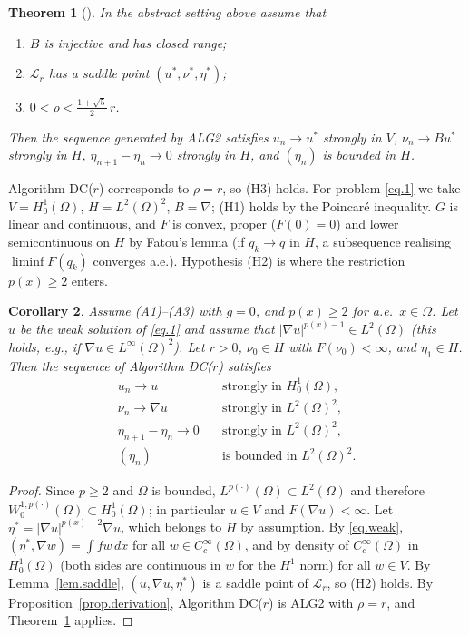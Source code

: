 \documentclass[11pt]{amsart}
\newcommand{\LL}{\mathcal L}
\newcommand{\dx}{\,dx}
\newcommand{\pp}{p(\cdot)}
\newtheorem{teo}{Theorem}[section]
\newtheorem{corol}[teo]{Corollary}
\theoremstyle{definition}
\theoremstyle{remark}
\numberwithin{equation}{section}
\begin{document}
\begin{teo}[{\cite[Chapter~VI, Theorem~5.1]{Glowinski}}]\label{thm.glowinski}
In the abstract setting above assume that
\begin{enumerate}
\item[(H1)] $B$ is injective and has closed range;
\item[(H2)] $\LL_r$ has a saddle point $(u^*,\nu^*,\eta^*)$;
\item[(H3)] $0<\rho<\frac{1+\sqrt5}{2}\,r$.
\end{enumerate}
Then the sequence generated by ALG2 satisfies $u_n\to u^*$ strongly in $V$, $\nu_n\to Bu^*$ strongly in $H$, $\eta_{n+1}-\eta_n\to0$ strongly in $H$, and $(\eta_n)$ is bounded in $H$.
\end{teo}

Algorithm DC($r$) corresponds to $\rho=r$, so (H3) holds. For problem \eqref{eq.1} we take $V=H^1_0(\Omega)$, $H=L^2(\Omega)^2$, $B=\nabla$; (H1) holds by the Poincar\'e inequality. $G$ is linear and continuous, and $F$ is convex, proper ($F(0)=0$) and lower semicontinuous on $H$ by Fatou's lemma (if $q_k\to q$ in $H$, a subsequence realising $\liminf F(q_k)$ converges a.e.). Hypothesis (H2) is where the restriction $p(x)\ge2$ enters.

\begin{corol}\label{cor.convergence}
Assume (A1)--(A3) with $g=0$, and $p(x)\ge 2$ for a.e.\ $x\in\Omega$. Let $u$ be the weak solution of \eqref{eq.1} and assume that $|\nabla u|^{p(x)-1}\in L^2(\Omega)$ (this holds, e.g., if $\nabla u\in L^\infty(\Omega)^2$). Let $r>0$, $\nu_0\in H$ with $F(\nu_0)<\infty$, and $\eta_1\in H$. Then the sequence of Algorithm DC($r$) satisfies
\begin{align*}
u_n \to u &\quad \text{strongly in } H^1_0(\Omega),\\
\nu_n \to \nabla u &\quad \text{strongly in } L^2(\Omega)^2,\\
\eta_{n+1}-\eta_n \to 0 & \quad \text{strongly in } L^2(\Omega)^2,\\
(\eta_n) &\quad \text{is bounded in } L^2(\Omega)^2.
\end{align*}
\end{corol}

\begin{proof}
Since $p\ge2$ and $\Omega$ is bounded, $L^{\pp}(\Omega)\subset L^2(\Omega)$ and therefore $W^{1,\pp}_0(\Omega)\subset H^1_0(\Omega)$; in particular $u\in V$ and $F(\nabla u)<\infty$. Let $\eta^*=|\nabla u|^{p(x)-2}\nabla u$, which belongs to $H$ by assumption. By \eqref{eq.weak}, $(\eta^*,\nabla w)=\int fw\dx$ for all $w\in C^\infty_c(\Omega)$, and by density of $C^\infty_c(\Omega)$ in $H^1_0(\Omega)$ (both sides are continuous in $w$ for the $H^1$ norm) for all $w\in V$. By Lemma~\ref{lem.saddle}, $(u,\nabla u,\eta^*)$ is a saddle point of $\LL_r$, so (H2) holds. By Proposition~\ref{prop.derivation}, Algorithm DC($r$) is ALG2 with $\rho=r$, and Theorem~\ref{thm.glowinski} applies.
\end{proof}
\end{document}

